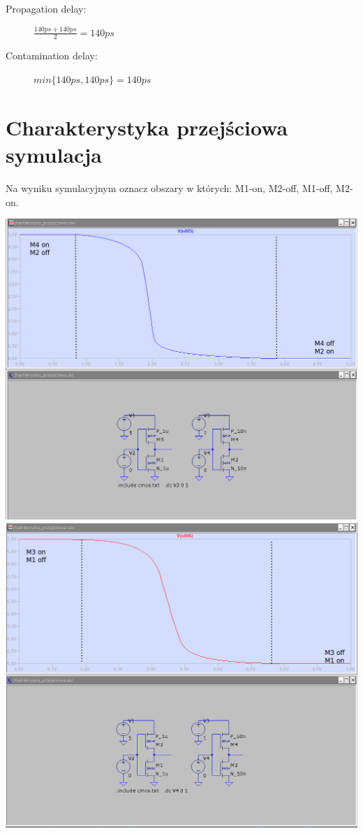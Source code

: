 \documentclass[a4paper, 11pt]{article}
\begin{document}
\begin{description}
\begin{center}
	      \end{center}
	\item[Propagation delay:] $\frac{140ps + 140ps}{2} = 140ps $
	\item[Contamination delay:] $ min\{140ps, 140ps\} = 140ps $
\end{description}

\pagebreak

\section{Charakterystyka przejściowa symulacja}\label{sec:charakterystypa przejsciuowa} %
Na wyniku symulacyjnym oznacz obszary w których: M1-on, M2-off, M1-off, M2-on.

\begin{center}
	\includegraphics[scale=0.3]{images/sym_rysA.png}
	\includegraphics[scale=0.3]{images/sym_rysB.png}
\end{center}
\end{document}
